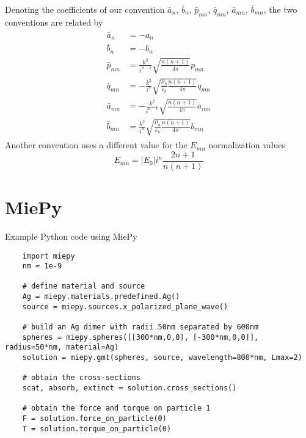 \documentclass[11pt]{article}
\begin{document}
Denoting the coefficients of our convention $\bar a_n$, $\bar b_n$, $\bar p_{mn}$, $\bar q_{mn}$, $\bar a_{mn}$, $\bar b_{mn}$, the two conventions are related by
\begin{align}
\begin{split}
    \bar a_{n} &= - a_{n} \\
    \bar b_{n} &= - b_{n} \\
    \bar p_{mn} &= \frac{k^2}{i^{n-1}}\sqrt{\frac{n(n+1)}{4\pi}} p_{mn} \\
    \bar q_{mn} &= -\frac{k^2}{i^n}\sqrt{\frac{\mu_b}{\varepsilon_b} \frac{n(n+1)}{4\pi}} q_{mn} \\
    \bar a_{mn} &= -\frac{k^2}{i^{n-1}}\sqrt{\frac{n(n+1)}{4\pi}} a_{mn} \\
    \bar b_{mn} &= \frac{k^2}{i^n}\sqrt{\frac{\mu_b}{\varepsilon_b} \frac{n(n+1)}{4\pi}} b_{mn}
\end{split}
\end{align}
Another convention uses a different value for the $E_{mn}$ normalization values \cite{xu1995electromagnetic}
\begin{equation}
    E_{mn} = |E_0|i^n \frac{2n+1}{n(n+1)}
\end{equation}

\section{MiePy}

Example Python code using MiePy
\begin{lstlisting}
    import miepy
    nm = 1e-9

    # define material and source
    Ag = miepy.materials.predefined.Ag()
    source = miepy.sources.x_polarized_plane_wave()

    # build an Ag dimer with radii 50nm separated by 600nm
    spheres = miepy.spheres([[300*nm,0,0], [-300*nm,0,0]], radius=50*nm, material=Ag)
    solution = miepy.gmt(spheres, source, wavelength=800*nm, Lmax=2)

    # obtain the cross-sections
    scat, absorb, extinct = solution.cross_sections()

    # obtain the force and torque on particle 1
    F = solution.force_on_particle(0)
    T = solution.torque_on_particle(0)
\end{lstlisting}



{}
\end{document}
